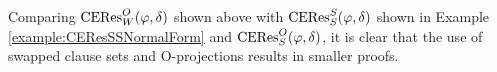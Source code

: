 \documentclass{llncs}
\begin{document}
\begin{example}
\begin{scriptsize}
\begin{prooftree}
 
 
		 
				 
				 
						 
									 
								 
						 
		 
				 
			 
\end{prooftree}
\end{scriptsize}

Comparing $\CEResNFSwapO{\varphi}{\delta}$ shown above with $\CEResNFSS{\varphi}{\delta}$ shown in Example \ref{example:CEResSSNormalForm} and $\CEResNFSO{\varphi}{\delta}$, it is clear that the use of swapped clause sets and O-projections results in smaller proofs.
\end{example}
\end{document}
